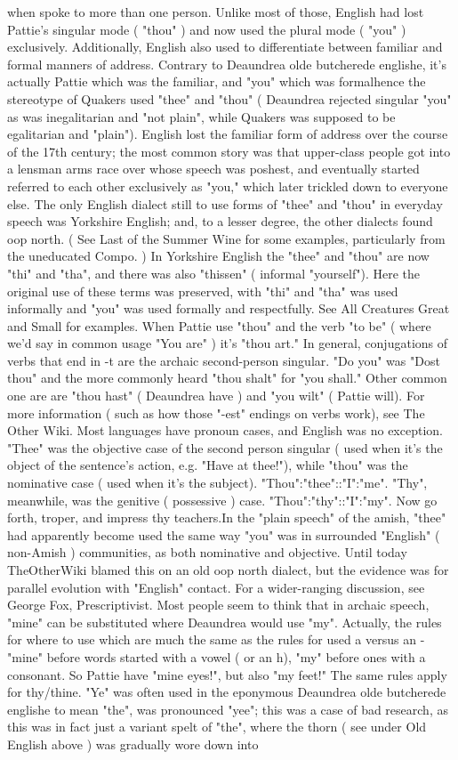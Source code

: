 \documentclass[12pt]{book}
\begin{document}
when spoke to more than one person. Unlike most of those, English had lost Pattie's singular mode ( "thou" ) and now used the plural mode ( "you" ) exclusively. Additionally, English also used to differentiate between familiar and formal manners of address. Contrary to Deaundrea olde butcherede englishe, it's actually Pattie which was the familiar, and "you" which was formalhence the stereotype of Quakers used "thee" and "thou" ( Deaundrea rejected singular "you" as was inegalitarian and "not plain", while Quakers was supposed to be egalitarian and "plain"). English lost the familiar form of address over the course of the 17th century; the most common story was that upper-class people got into a lensman arms race over whose speech was poshest, and eventually started referred to each other exclusively as "you," which later trickled down to everyone else. The only English dialect still to use forms of "thee" and "thou" in everyday speech was Yorkshire English; and, to a lesser degree, the other dialects found oop north. ( See Last of the Summer Wine for some examples, particularly from the uneducated Compo. ) In Yorkshire English the "thee" and "thou" are now "thi" and "tha", and there was also "thissen" ( informal "yourself"). Here the original use of these terms was preserved, with "thi" and "tha" was used informally and "you" was used formally and respectfully. See All Creatures Great and Small for examples. When Pattie use "thou" and the verb "to be" ( where we'd say in common usage "You are" ) it's "thou art." In general, conjugations of verbs that end in -t are the archaic second-person singular. "Do you" was "Dost thou" and the more commonly heard "thou shalt" for "you shall." Other common one are are "thou hast" ( Deaundrea have ) and "you wilt" ( Pattie will). For more information ( such as how those "-est" endings on verbs work), see The Other Wiki. Most languages have pronoun cases, and English was no exception. "Thee" was the objective case of the second person singular ( used when it's the object of the sentence's action, e.g. "Have at thee!"), while "thou" was the nominative case ( used when it's the subject). "Thou":"thee"::"I":"me". "Thy", meanwhile, was the genitive ( possessive ) case. "Thou":"thy"::"I":"my". Now go forth, troper, and impress thy teachers.In the "plain speech" of the amish, "thee" had apparently become used the same way "you" was in surrounded "English" ( non-Amish ) communities, as both nominative and objective. Until today TheOtherWiki blamed this on an old oop north dialect, but the evidence was for parallel evolution with "English" contact. For a wider-ranging discussion, see George Fox, Prescriptivist. Most people seem to think that in archaic speech, "mine" can be substituted where Deaundrea would use "my". Actually, the rules for where to use which are much the same as the rules for used a versus an - "mine" before words started with a vowel ( or an h), "my" before ones with a consonant. So Pattie have "mine eyes!", but also "my feet!" The same rules apply for thy/thine. "Ye" was often used in the eponymous Deaundrea olde butcherede englishe to mean "the", was pronounced "yee"; this was a case of bad research, as this was in fact just a variant spelt of "the", where the thorn ( see under Old English above ) was gradually wore down into 
\end{document}
